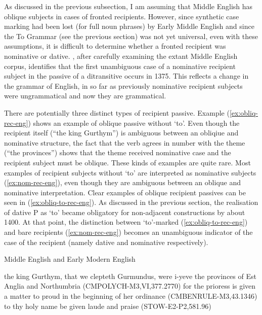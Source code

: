 	As discussed in the previous subsection, I am assuming that Middle English has oblique subjects in cases of fronted recipients. However, since synthetic case marking had been lost (for full noun phrases) by Early Middle English and since the To Grammar (see the previous section) was not yet universal, even with these assumptions, it is difficult to determine whether a fronted recipient was nominative or dative. \cite{Allen.1999}, after carefully examining the extant Middle English corpus, identifies that the first unambiguous case of a nominative recipient subject in the passive of a ditransitive occurs in 1375. This reflects a change in the grammar of English, in so far as previously nominative recipient subjects were ungrammatical and now they are grammatical.

	There are potentially three distinct types of recipient passive. Example (\ref{ex:obliq-rec-eng}) shows an example of oblique passive without `to'. Even though the recipient itself (``the king Gurthym'') is ambiguous between an obliqiue and nominative structure, the fact that the verb agrees in number with the theme (``the provinces'') shows that the theme received nominative case and the recipient subject must be oblique. These kinds of examples are quite rare. Most examples of recipient subjects without `to' are interpreted as nominative subjects (\ref{ex:nom-rec-eng}), even though they are ambiguous between an oblique and nominative interpretation. Clear examples of oblique recipient passives can be seen in (\ref{ex:obliq-to-rec-eng}). As discussed in the previous section, the realisation of dative P as `to' became obligatory for non-adjacent constructions by about 1400. At that point, the distinction between `to'-marked (\ref{ex:obliq-to-rec-eng}) and bare recipients (\ref{ex:nom-rec-eng}) becomes an unambiguous indicator of the case of the recipient (namely dative and nominative respectively).

	\begin{exe}
		\ex Middle English \citep{Kroch.2000} and Early Modern English \citep{Kroch.2004}
		\begin{xlist}
			\ex\label{ex:obliq-rec-eng} the king Gurthym, that we clepteth Gurmundus, were i-yeve the provinces of Est Anglia and Northumbria (CMPOLYCH-M3,VI,377.2770)
			\ex\label{ex:nom-rec-eng} for the prioress is given a matter to proud in the beginning of her ordinance (CMBENRULE-M3,43.1346)
			\ex\label{ex:obliq-to-rec-eng} to thy holy name be given laude and praise (STOW-E2-P2,581.96)
		\end{xlist}
	\end{exe}

